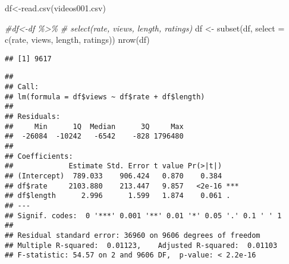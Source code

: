 \documentclass[
]{article}
\newenvironment{Shaded}{\begin{snugshade}}{\end{snugshade}}
\newcommand{\AttributeTok}[1]{\textcolor[rgb]{0.77,0.63,0.00}{#1}}
\newcommand{\CommentTok}[1]{\textcolor[rgb]{0.56,0.35,0.01}{\textit{#1}}}
\newcommand{\FunctionTok}[1]{\textcolor[rgb]{0.00,0.00,0.00}{#1}}
\newcommand{\NormalTok}[1]{#1}
\newcommand{\OtherTok}[1]{\textcolor[rgb]{0.56,0.35,0.01}{#1}}
\newcommand{\SpecialCharTok}[1]{\textcolor[rgb]{0.00,0.00,0.00}{#1}}
\newcommand{\StringTok}[1]{\textcolor[rgb]{0.31,0.60,0.02}{#1}}
\begin{document}
\begin{Shaded}
\begin{Highlighting}[]
\NormalTok{df}\OtherTok{\textless{}{-}}\FunctionTok{read.csv}\NormalTok{(}\StringTok{\textquotesingle{}videos001.csv\textquotesingle{}}\NormalTok{)}

\CommentTok{\#df\textless{}{-}df \%\textgreater{}\% }
\CommentTok{\#  select(\textquotesingle{}rate\textquotesingle{}, \textquotesingle{}views\textquotesingle{}, \textquotesingle{}length\textquotesingle{}, \textquotesingle{}ratings\textquotesingle{}) }
\NormalTok{df }\OtherTok{\textless{}{-}} \FunctionTok{subset}\NormalTok{(df, }\AttributeTok{select =} \FunctionTok{c}\NormalTok{(}\StringTok{\textquotesingle{}rate\textquotesingle{}}\NormalTok{, }\StringTok{\textquotesingle{}views\textquotesingle{}}\NormalTok{, }\StringTok{\textquotesingle{}length\textquotesingle{}}\NormalTok{, }\StringTok{\textquotesingle{}ratings\textquotesingle{}}\NormalTok{))  }
\FunctionTok{nrow}\NormalTok{(df)}
\end{Highlighting}
\end{Shaded}

\begin{verbatim}
## [1] 9617
\end{verbatim}

\begin{Shaded}
\end{Shaded}

\begin{verbatim}
## 
## Call:
## lm(formula = df$views ~ df$rate + df$length)
## 
## Residuals:
##     Min      1Q  Median      3Q     Max 
##  -26084  -10242   -6542    -828 1796480 
## 
## Coefficients:
##             Estimate Std. Error t value Pr(>|t|)    
## (Intercept)  789.033    906.424   0.870    0.384    
## df$rate     2103.880    213.447   9.857   <2e-16 ***
## df$length      2.996      1.599   1.874    0.061 .  
## ---
## Signif. codes:  0 '***' 0.001 '**' 0.01 '*' 0.05 '.' 0.1 ' ' 1
## 
## Residual standard error: 36960 on 9606 degrees of freedom
## Multiple R-squared:  0.01123,    Adjusted R-squared:  0.01103 
## F-statistic: 54.57 on 2 and 9606 DF,  p-value: < 2.2e-16
\end{verbatim}
\end{document}
